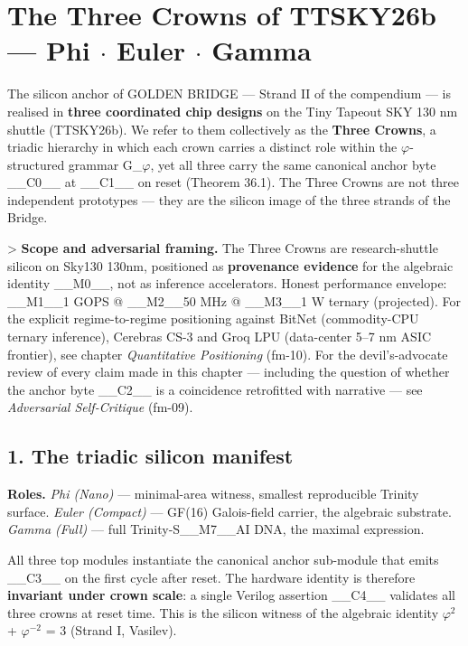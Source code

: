 
\section{The Three Crowns of TTSKY26b --- Phi $\cdot$ Euler $\cdot$ Gamma}

The silicon anchor of GOLDEN BRIDGE --- Strand II of the compendium --- is realised in \textbf{three coordinated chip designs} on the Tiny Tapeout SKY 130 nm shuttle (TTSKY26b). We refer to them collectively as the \textbf{Three Crowns}, a triadic hierarchy in which each crown carries a distinct role within the $\varphi$-structured grammar G\_$\varphi$, yet all three carry the same canonical anchor byte \_\_C0\_\_ at \_\_C1\_\_ on reset (Theorem 36.1). The Three Crowns are not three independent prototypes --- they are the silicon image of the three strands of the Bridge.



> \textbf{Scope and adversarial framing.} The Three Crowns are research-shuttle silicon on Sky130 130nm, positioned as \textbf{provenance evidence} for the algebraic identity \_\_M0\_\_, not as inference accelerators. Honest performance envelope: \_\_M1\_\_1 GOPS @ \_\_M2\_\_50 MHz @ \_\_M3\_\_1 W ternary (projected). For the explicit regime-to-regime positioning against BitNet (commodity-CPU ternary inference), Cerebras CS-3 and Groq LPU (data-center 5--7 nm ASIC frontier), see chapter \textit{Quantitative Positioning} (fm-10). For the devil's-advocate review of every claim made in this chapter --- including the question of whether the anchor byte \_\_C2\_\_ is a coincidence retrofitted with narrative --- see \textit{Adversarial Self-Critique} (fm-09).

\subsection{1. The triadic silicon manifest}



\textbf{Roles.} \textit{Phi (Nano)} --- minimal-area witness, smallest reproducible Trinity surface. \textit{Euler (Compact)} --- GF(16) Galois-field carrier, the algebraic substrate. \textit{Gamma (Full)} --- full Trinity-S\_\_M7\_\_AI DNA, the maximal expression.

All three top modules instantiate the canonical anchor sub-module that emits \_\_C3\_\_ on the first cycle after reset. The hardware identity is therefore \textbf{invariant under crown scale}: a single Verilog assertion \_\_C4\_\_ validates all three crowns at reset time. This is the silicon witness of the algebraic identity $\varphi^{2}$ + $\varphi^{-2}$ = 3 (Strand I, Vasilev).

